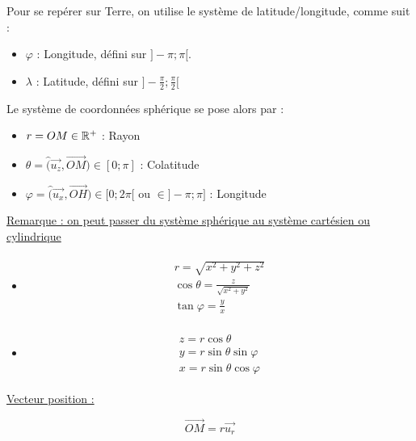 \documentclass{article}
\begin{document}
Pour se repérer sur Terre, on utilise le système de latitude/longitude, comme suit :

\begin{itemize}
    \item $\varphi$ : Longitude, défini sur $]-\pi;\pi[$.
    \item $\lambda$ : Latitude, défini sur $]-\frac{\pi}{2};\frac{\pi}{2}[$
\end{itemize}

Le système de coordonnées sphérique se pose alors par :

\begin{itemize}
    \item $r=OM\in\mathbb{R}^+$ : Rayon
    \item $\theta=\hat(\overrightarrow{u_z},\overrightarrow{OM})\in [0;\pi ]$ : Colatitude
    \item $\varphi=\hat(\overrightarrow{u_x},\overrightarrow{OH})\in [0;2\pi [$ ou $\in ]-\pi;\pi ]$ : Longitude
\end{itemize}



\underline{Remarque : on peut passer du système sphérique au système cartésien ou cylindrique}

\begin{itemize}
    \item 
        \begin{align*}\begin{split}
        r = \sqrt{x^2+y^2+z^2}\\
        \cos\theta=\frac{z}{\sqrt{x^2+y^2}}\\
        \tan\varphi=\frac{y}{x}
        \end{split}\end{align*}

    \item
        \begin{align*}\begin{split}
            z=r\cos\theta\\
            y=r\sin\theta\sin\varphi\\
            x=r\sin\theta\cos\varphi
        \end{split}\end{align*}
\end{itemize}

\underline{Vecteur position :}

$$
\boxed{\overrightarrow{OM}=r\overrightarrow{u_r}}
$$
\end{document}
